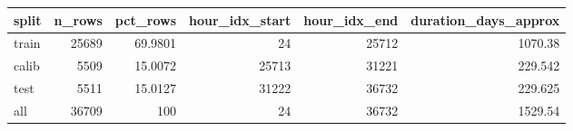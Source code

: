 \begin{tabular}{lrrrrr}
\toprule
split & n\_rows & pct\_rows & hour\_idx\_start & hour\_idx\_end & duration\_days\_approx \\
\midrule
train & 25689 & 69.9801 & 24 & 25712 & 1070.38 \\
calib & 5509 & 15.0072 & 25713 & 31221 & 229.542 \\
test & 5511 & 15.0127 & 31222 & 36732 & 229.625 \\
all & 36709 & 100 & 24 & 36732 & 1529.54 \\
\bottomrule
\end{tabular}
